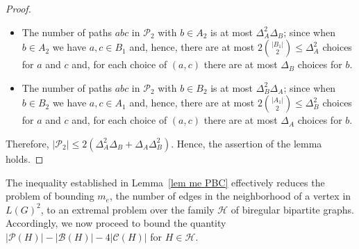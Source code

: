 \documentclass[11pt]{amsart}
\newcommand{\pp}{\mathcal{P}}
\newcommand{\cc}{\mathcal{C}}
\newcommand{\bb}{\mathcal{B}}
\newcommand{\hh}{\mathcal{H}}
\begin{document}
\begin{proof}
\begin{itemize}
    \item The number of paths $abc$ in $\pp_2$ with $b\in A_2$ is at most $\Delta_A^2\Delta_B$; since when $b\in A_2$ we have $a,c\in B_1$ and, hence, there are at most $2\binom{|B_1|}{2}\le \Delta_A^2$ choices for $a$ and $c$ and, for each choice of $(a,c)$  there are at most $\Delta_B$ choices for $b$.

    \item The number of paths $abc$ in $\pp_2$ with $b\in B_2$ is at most $\Delta_B^2\Delta_A$; since when $b\in B_2$ we have $a,c\in A_1$ and, hence, there are at most $2\binom{|A_1|}{2}\le \Delta_B^2$ choices for $a$ and $c$ and, for each choice of $(a,c)$ there are at most $\Delta_A$ choices for $b$.
\end{itemize} 
Therefore, $|\mathcal{P}_2|\le 2(\Delta_A^2 \Delta_B + \Delta_A\Delta_B^2)$. Hence, the assertion of the lemma holds.  
\end{proof}

The inequality established in Lemma~\ref{lem me PBC} effectively reduces the problem of bounding $m_e$, the number of edges in the neighborhood of a vertex in $L(G)^2$, to an extremal problem over the family $\hh$ of biregular bipartite graphs. Accordingly, we now proceed to bound the quantity $|\mathcal P(H)| - |\mathcal B(H)| - 4|\mathcal C(H)|$ for $H\in \hh$. 

\end{document}
